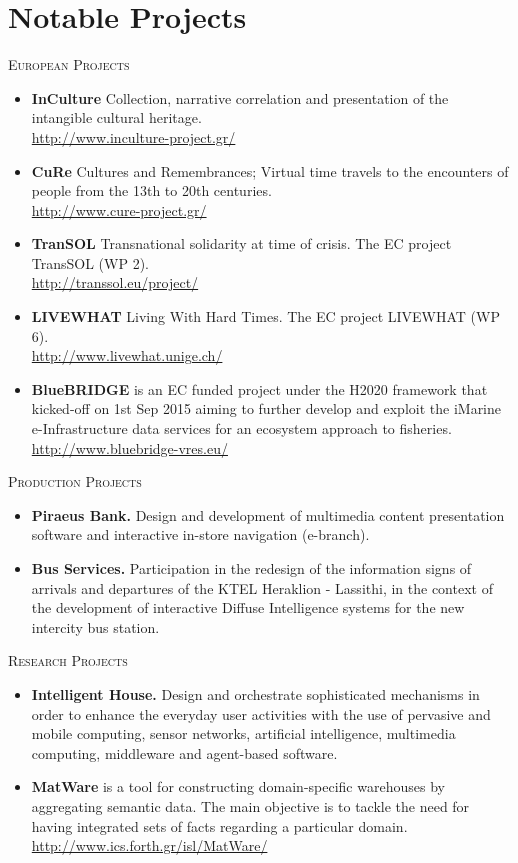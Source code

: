 \documentclass[11pt]{article}
\begin{document}
\section{Notable Projects}
\textsc{European Projects}
\begin{itemize}
\item
\textbf{InCulture} Collection, narrative correlation and presentation of the intangible cultural heritage. \\ \url{http://www.inculture-project.gr/}
\item
\textbf{CuRe} Cultures and Remembrances; Virtual time travels to the encounters of people from the 13th to 20th centuries. \\ \url{http://www.cure-project.gr/}
\item
\textbf{TranSOL} Transnational solidarity at time of crisis. The EC project TransSOL (WP 2). \\ \url{http://transsol.eu/project/}
\item
\textbf{LIVEWHAT} Living With Hard Times. The EC project LIVEWHAT (WP 6).  \\\url{http://www.livewhat.unige.ch/}
\item
\textbf{BlueBRIDGE} is an EC funded project under the H2020 framework that kicked-off on 1st Sep 2015 aiming to further develop and exploit the iMarine e-Infrastructure data services for an ecosystem approach to fisheries. \\\url{http://www.bluebridge-vres.eu/}
\end{itemize}

\textsc{Production Projects}
\begin{itemize}
\item
\textbf{Piraeus Bank.} Design and development of multimedia content presentation software and interactive in-store navigation (e-branch).
\item
\textbf{Bus Services.} Participation in the redesign of the information signs of arrivals and departures of the KTEL Heraklion - Lassithi, in the context of the development of interactive Diffuse Intelligence systems for the new intercity bus station.
\end{itemize}

\textsc{Research Projects}
\begin{itemize}
\item
\textbf{Intelligent House.} Design and orchestrate sophisticated mechanisms in order to enhance the everyday user activities with the use of pervasive and mobile computing, sensor networks, artificial intelligence, multimedia computing, middleware and agent-based software.

\item
\textbf{MatWare} is a tool for constructing domain-specific warehouses by aggregating semantic data. The main objective is to tackle the need for having integrated sets of facts regarding a particular domain. \url{http://www.ics.forth.gr/isl/MatWare/}
\end{itemize}
\end{document}
